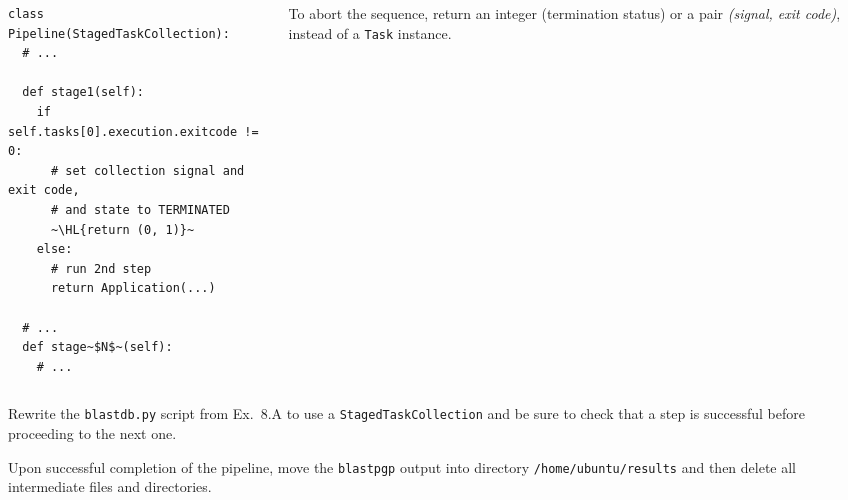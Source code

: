 \documentclass[english,serif,mathserif,xcolor=pdftex,dvipsnames,table]{beamer}
\begin{document}
\begin{frame}[fragile]
  \begin{columns}[c]
    \begin{column}{0.6\textwidth}
      \begin{lstlisting}
class Pipeline(StagedTaskCollection):
  # ...

  def stage1(self):
    if self.tasks[0].execution.exitcode != 0:
      # set collection signal and exit code,
      # and state to TERMINATED
      ~\HL{return (0, 1)}~
    else:
      # run 2nd step
      return Application(...)

  # ...
  def stage~$N$~(self):
    # ...
      \end{lstlisting}
    \end{column}
    \begin{column}{0.4\textwidth}
      \raggedleft

      \+\+\+\+\+ 
      To abort the sequence, return an integer (termination
      status) or a pair \emph{(signal, exit code)}, instead of a
      \texttt{Task} instance.
    \end{column}
  \end{columns}
\end{frame}


\begin{frame}
  \begin{exercise*}[8.C]
    Rewrite the \texttt{blastdb.py} script from Ex.~8.A to use a
    \texttt{StagedTaskCollection} and be sure to check that a step is
    successful before proceeding to the next one.

    \+
    Upon successful completion of the pipeline, move the
    \texttt{blastpgp} output into directory
    \texttt{/home/ubuntu/results} and then delete all intermediate
    files and directories.
  \end{exercise*}
\end{frame}
\end{document}
